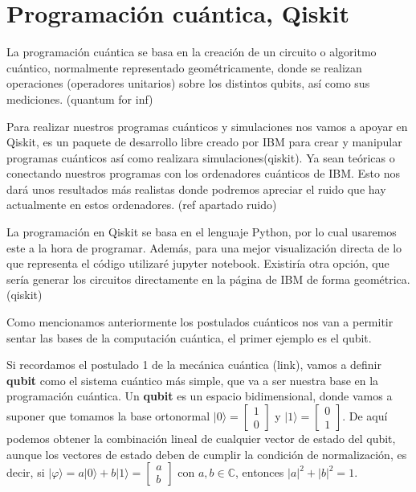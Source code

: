 \newpage

\section{Programación cuántica, Qiskit}
 La programación cuántica se basa en la creación de un circuito o algoritmo cuántico, normalmente representado geométricamente, donde se realizan operaciones (operadores unitarios) sobre los distintos qubits, así como sus mediciones. (quantum for inf)\newline

 Para realizar nuestros programas cuánticos y simulaciones nos vamos a apoyar en Qiskit, es un paquete de desarrollo libre creado por IBM para crear y manipular programas cuánticos así como realizara simulaciones(qiskit). Ya sean teóricas o conectando nuestros programas con los ordenadores cuánticos de IBM. Esto nos dará unos resultados más realistas donde podremos apreciar el ruido que hay actualmente en estos ordenadores. (ref apartado ruido) \newline
 
 La programación en Qiskit se basa en el lenguaje Python, por lo cual usaremos este a la hora de programar. Además, para una mejor visualización directa de lo que representa el código utilizaré jupyter notebook. Existiría otra opción, que sería generar los circuitos directamente en la página de IBM de forma geométrica.(qiskit) \newline
 
 Como mencionamos anteriormente los postulados cuánticos nos van a permitir sentar las bases de la computación cuántica, el primer ejemplo es el qubit. \newline
 
 Si recordamos el postulado 1 de la mecánica cuántica (link), vamos a definir \textbf{qubit} como el sistema cuántico más simple, que va a ser nuestra base en la programación cuántica. Un \textbf{qubit} es un espacio bidimensional, donde vamos a suponer que tomamos la base ortonormal $|0 \rangle = \begin{bmatrix} 1\\0 \end{bmatrix}$ y $|1 \rangle = \begin{bmatrix} 0\\1 \end{bmatrix}$. De aquí podemos obtener la combinación lineal de cualquier vector de estado del qubit, aunque los vectores de estado deben de cumplir la condición de normalización, es decir, si $|\varphi \rangle = a |0\rangle + b |1\rangle = \begin{bmatrix} a\\b \end{bmatrix}$ con $a,b \in \mathbb{C}$, entonces $|a|^{2}+|b|^{2}=1$.\newline

